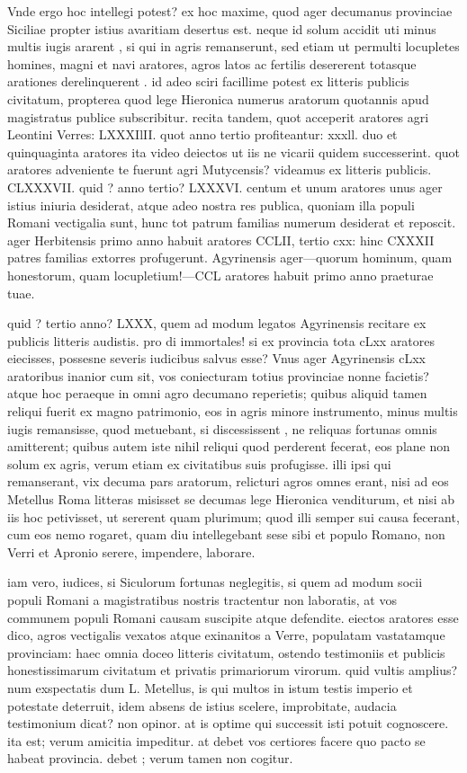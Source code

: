  Vnde ergo hoc intellegi potest? ex hoc maxime, quod ager decumanus provinciae Siciliae propter istius avaritiam desertus est. neque id solum accidit uti minus multis iugis ararent , si qui in agris remanserunt, sed etiam ut permulti locupletes homines, magni et navi aratores, agros latos ac fertilis desererent totasque arationes derelinquerent . id adeo sciri facillime potest ex litteris publicis civitatum, propterea quod lege Hieronica numerus aratorum quotannis apud magistratus publice subscribitur. recita tandem, quot acceperit aratores agri Leontini Verres: LXXXIlII. quot anno tertio profiteantur: xxxll. duo et quinquaginta aratores ita video deiectos ut iis ne vicarii quidem successerint. quot aratores adveniente te fuerunt agri Mutycensis? videamus ex litteris publicis. CLXXXVII. quid ? anno tertio? LXXXVI. centum et unum aratores unus ager istius iniuria desiderat, atque adeo nostra res publica, quoniam illa populi Romani vectigalia sunt, hunc tot patrum familias numerum desiderat et reposcit. ager Herbitensis primo anno habuit aratores CCLII, tertio cxx: hinc CXXXII patres familias extorres profugerunt. Agyrinensis ager—quorum hominum, quam honestorum, quam locupletium!—CCL aratores habuit primo anno praeturae tuae.

 quid ? tertio anno? LXXX, quem ad modum legatos Agyrinensis recitare ex publicis litteris audistis. pro di immortales! si ex provincia tota cLxx aratores eiecisses, possesne severis iudicibus salvus esse? Vnus ager Agyrinensis cLxx aratoribus inanior cum sit, vos coniecturam totius provinciae nonne facietis? atque hoc peraeque in omni agro decumano reperietis; quibus aliquid tamen reliqui fuerit ex magno patrimonio, eos in agris minore instrumento, minus multis iugis remansisse, quod metuebant, si discessissent , ne reliquas fortunas omnis amitterent; quibus autem iste nihil reliqui quod perderent fecerat, eos plane non solum ex agris, verum etiam ex civitatibus suis profugisse. illi ipsi qui remanserant, vix decuma pars aratorum, relicturi agros omnes erant, nisi ad eos Metellus Roma litteras misisset se decumas lege Hieronica venditurum, et nisi ab iis hoc petivisset, ut sererent quam plurimum; quod illi semper sui causa fecerant, cum eos nemo rogaret, quam diu intellegebant sese sibi et populo Romano, non Verri et Apronio serere, impendere, laborare.

 iam vero, iudices, si Siculorum fortunas neglegitis, si quem ad modum socii populi Romani a magistratibus nostris tractentur non laboratis, at vos communem populi Romani causam suscipite atque defendite. eiectos aratores esse dico, agros vectigalis vexatos atque exinanitos a Verre, populatam vastatamque provinciam: haec omnia doceo litteris civitatum, ostendo testimoniis et publicis honestissimarum civitatum et privatis primariorum virorum. quid vultis amplius? num exspectatis dum L. Metellus, is qui multos in istum testis imperio et potestate deterruit, idem absens de istius scelere, improbitate, audacia testimonium dicat? non opinor. at is optime qui successit isti potuit cognoscere. ita est; verum amicitia impeditur. at debet vos certiores facere quo pacto se habeat provincia. debet ; verum tamen non cogitur.

